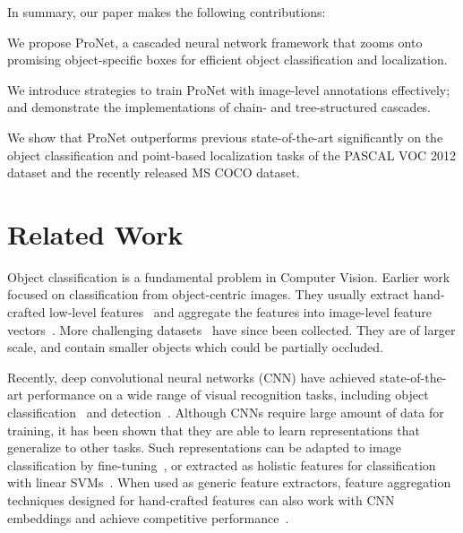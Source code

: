 \documentclass[10pt,twocolumn,letterpaper]{article}
\begin{document}
In summary, our paper makes the following contributions:
\begin{compactitem}
\item We propose ProNet, a cascaded neural network framework that zooms onto promising object-specific boxes for efficient object classification and localization.
\item We introduce strategies to train ProNet with image-level annotations effectively; and demonstrate the implementations of chain- and tree-structured cascades.
\item We show that ProNet outperforms previous state-of-the-art significantly on the object classification and point-based localization tasks of the PASCAL VOC 2012 dataset and the recently released MS COCO dataset.
\end{compactitem}

\section{Related Work}
Object classification is a fundamental problem in Computer Vision. Earlier work~\cite{DBLP:conf/iccv/GraumanD05,DBLP:journals/cviu/Fei-FeiFP07,DBLP:journals/ijcv/SanchezPMV13} focused on classification from object-centric images. They usually extract hand-crafted low-level features~\cite{DBLP:journals/ijcv/Lowe04} and aggregate the features into image-level feature vectors~\cite{Perronnin07FV,DBLP:conf/cvpr/WangYYLHG10}. More challenging datasets~\cite{Everingham10,DBLP:journals/corr/LinMBHPRDZ14,ILSVRCarxiv14} have since been collected. They are of larger scale, and contain smaller objects which could be partially occluded.

Recently, deep convolutional neural networks (CNN) have achieved state-of-the-art performance on a wide range of visual recognition tasks, including object classification~\cite{NIPS2012_4824,Simonyan14c,DBLP:journals/corr/SermanetEZMFL13} and detection~\cite{DBLP:journals/corr/GirshickDDM13,DBLP:journals/corr/Girshick15}. Although CNNs require large amount of data for training, it has been shown that they are able to learn representations that generalize to other tasks. Such representations can be adapted to image classification by fine-tuning~\cite{DBLP:conf/cvpr/OquabBLS14}, or extracted as holistic features for classification with linear SVMs~\cite{DBLP:journals/corr/ChatfieldSVZ14}. When used as generic feature extractors, feature aggregation techniques designed for hand-crafted features can also work with CNN embeddings and achieve competitive performance~\cite{DBLP:journals/corr/GongWGL14}.
\end{document}
